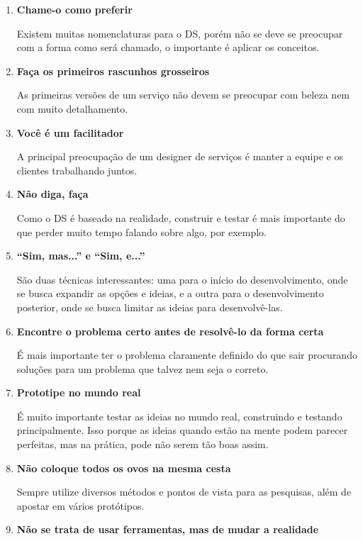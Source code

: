 \begin{enumerate}
	\item \textbf{Chame-o como preferir}
	
	Existem muitas nomenclaturas para o DS, porém não se deve se preocupar com a forma como será chamado, o importante é aplicar os conceitos.
	
	\item \textbf{Faça os primeiros rascunhos grosseiros}
	
	As primeiras versões de um serviço não devem se preocupar com beleza nem com muito detalhamento.
	
	\item \textbf{Você é um facilitador}
	
	A principal preocupação de um designer de serviços é manter a equipe e os clientes trabalhando juntos.
	
	\item \textbf{Não diga, faça}
	
	Como o DS é baseado na realidade, construir e testar é mais importante do que perder muito tempo falando sobre algo, por exemplo.
	
	\item \textbf{``Sim, mas...'' e ``Sim, e...''}
	
	São duas técnicas interessantes: uma para o início do desenvolvimento, onde se busca expandir as opções e ideias, e a outra para o desenvolvimento posterior, onde se busca limitar as ideias para desenvolvê-las.
	
	\item \textbf{Encontre o problema certo antes de resolvê-lo da forma certa}
	
	É mais importante ter o problema claramente definido do que sair procurando soluções para um problema que talvez nem seja o correto.
	
	\item \textbf{Prototipe no mundo real}
	
	É muito importante testar as ideias no mundo real, construindo e testando principalmente. Isso porque as ideias quando estão na mente podem parecer perfeitas, mas na prática, pode não serem tão boas assim.
	
	\item \textbf{Não coloque todos os ovos na mesma cesta}
	
	Sempre utilize diversos métodos e pontos de vista para as pesquisas, além de apostar em vários protótipos.
	
	\item \textbf{Não se trata de usar ferramentas, mas de mudar a realidade}
	

\end{enumerate}
